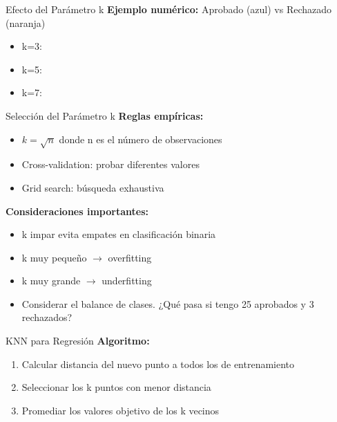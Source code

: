 \documentclass{beamer}
\begin{document}
\begin{frame}{Efecto del Parámetro k}
    \textbf{Ejemplo numérico:} Aprobado (azul) vs Rechazado (naranja)
    \begin{itemize}
        \item k=3: 
        \item k=5: 
        \item k=7: 
    \end{itemize}
\end{frame}

\begin{frame}{Selección del Parámetro k}
    \textbf{Reglas empíricas:}
    \begin{itemize}
        \item $k = \sqrt{n}$ donde n es el número de observaciones
        \item Cross-validation: probar diferentes valores
        \item Grid search: búsqueda exhaustiva
    \end{itemize}
    
    \textbf{Consideraciones importantes:}
    \begin{itemize}
        \item k impar evita empates en clasificación binaria
        \item k muy pequeño $\rightarrow$ overfitting
        \item k muy grande $\rightarrow$ underfitting
        \item Considerar el balance de clases. ¿Qué pasa si tengo 25 aprobados y 3 rechazados?
    \end{itemize}
\end{frame}

\begin{frame}{KNN para Regresión}
    \textbf{Algoritmo:}
    \begin{enumerate}
        \item Calcular distancia del nuevo punto a todos los de entrenamiento
        \item Seleccionar los k puntos con menor distancia
        \item Promediar los valores objetivo de los k vecinos
    \end{enumerate}
\end{frame}
\end{document}
